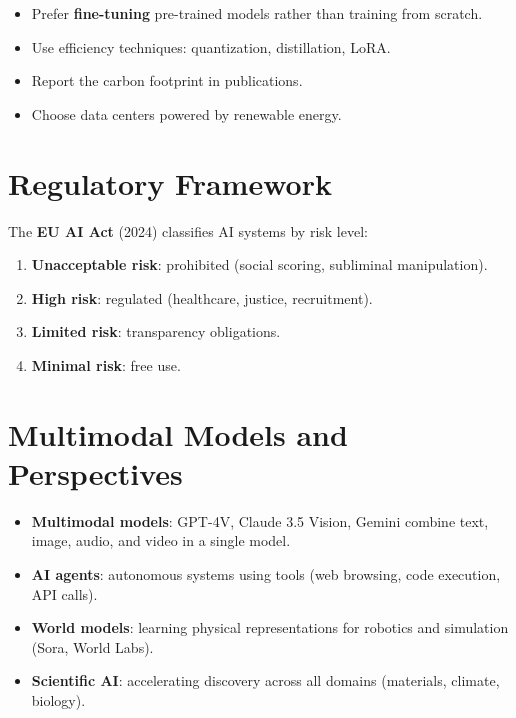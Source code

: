 \begin{bestpractice}
\begin{itemize}
\item Prefer \textbf{fine-tuning} pre-trained models rather than training from scratch.
\item Use efficiency techniques: quantization, distillation, LoRA.
\item Report the carbon footprint in publications.
\item Choose data centers powered by renewable energy.
\end{itemize}
\end{bestpractice}

\section{Regulatory Framework}
\label{sec:regulation}

The \textbf{EU AI Act} (2024) classifies AI systems by risk level:
\begin{enumerate}
\item \textbf{Unacceptable risk}: prohibited (social scoring, subliminal manipulation).
\item \textbf{High risk}: regulated (healthcare, justice, recruitment).
\item \textbf{Limited risk}: transparency obligations.
\item \textbf{Minimal risk}: free use.
\end{enumerate}

\section{Multimodal Models and Perspectives}
\label{sec:multimodal}

\begin{sota}
\begin{itemize}
\item \textbf{Multimodal models}: GPT-4V, Claude 3.5 Vision, Gemini combine text, image, audio, and video in a single model.
\item \textbf{AI agents}: autonomous systems using tools (web browsing, code execution, API calls).
\item \textbf{World models}: learning physical representations for robotics and simulation (Sora, World Labs).
\item \textbf{Scientific AI}: accelerating discovery across all domains (materials, climate, biology).
\end{itemize}
\end{sota}


